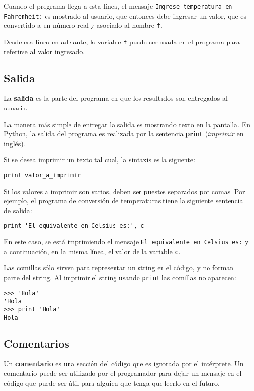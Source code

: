Cuando el programa llega a esta línea, el mensaje
\lstinline!Ingrese temperatura en Fahrenheit:! es mostrado al usuario,
que entonces debe ingresar un valor, que es convertido a un número real
y asociado al nombre \lstinline!f!.

Desde esa línea en adelante, la variable \lstinline!f! puede ser usada
en el programa para referirse al valor ingresado.

\subsection{Salida}

La \textbf{salida} es la parte del programa en que los resultados son
entregados al usuario.

La manera más simple de entregar la salida es mostrando texto en la
pantalla. En Python, la salida del programa es realizada por la
sentencia \textbf{print} (\emph{imprimir} en inglés).

Si se desea imprimir un texto tal cual, la sintaxis es la siguente:

\begin{lstlisting}
print valor_a_imprimir
\end{lstlisting}

Si los valores a imprimir son varios, deben ser puestos separados por
comas. Por ejemplo, el programa de conversión de temperaturas tiene la
siguiente sentencia de salida:

\begin{lstlisting}
print 'El equivalente en Celsius es:', c
\end{lstlisting}

En este caso, se está imprimiendo el mensaje
\lstinline!El equivalente en Celsius es:! y a continuación, en la misma
línea, el valor de la variable \lstinline!c!.

Las comillas sólo sirven para representar un string en el código, y no
forman parte del string. Al imprimir el string usando \lstinline!print!
las comillas no aparecen:

\begin{lstlisting}
>>> 'Hola'
'Hola'
>>> print 'Hola'
Hola
\end{lstlisting}

\subsection{Comentarios}

Un \textbf{comentario} es una sección del código que es ignorada por el
intérprete. Un comentario puede ser utilizado por el programador para
dejar un mensaje en el código que puede ser útil para alguien que tenga
que leerlo en el futuro.

